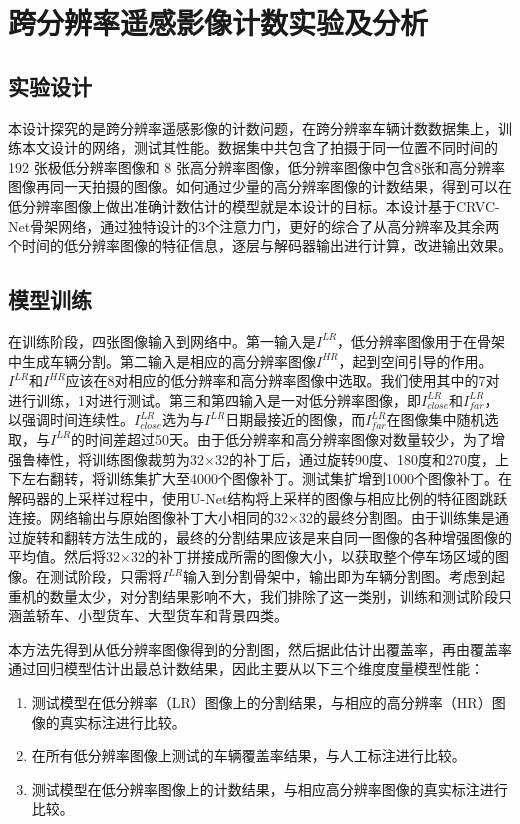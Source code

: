 \chapter{跨分辨率遥感影像计数实验及分析}
\section{实验设计}
本设计探究的是跨分辨率遥感影像的计数问题，在跨分辨率车辆计数数据集上，训练本文设计的网络，测试其性能。数据集中共包含了拍摄于同一位置不同时间的192 张极低分辨率图像和 8 张高分辨率图像，低分辨率图像中包含8张和高分辨率图像再同一天拍摄的图像。如何通过少量的高分辨率图像的计数结果，得到可以在低分辨率图像上做出准确计数估计的模型就是本设计的目标。本设计基于CRVC-Net骨架网络，通过独特设计的3个注意力门，更好的综合了从高分辨率及其余两个时间的低分辨率图像的特征信息，逐层与解码器输出进行计算，改进输出效果。

\section{模型训练}
在训练阶段，四张图像输入到网络中。第一输入是\( I^{LR}\)，低分辨率图像用于在骨架中生成车辆分割。第二输入是相应的高分辨率图像\( I^{HR}\)，起到空间引导的作用。\( I^{LR}\)和\( I^{HR}\)应该在8对相应的低分辨率和高分辨率图像中选取。我们使用其中的7对进行训练，1对进行测试。第三和第四输入是一对低分辨率图像，即\( I^{LR}_{close}\)和\( I^{LR}_{far}\)，以强调时间连续性。\( I^{LR}_{close}\)选为与\( I^{LR}\)日期最接近的图像，而\( I^{LR}_{far}\)在图像集中随机选取，与\( I^{LR}\)的时间差超过50天。由于低分辨率和高分辨率图像对数量较少，为了增强鲁棒性，将训练图像裁剪为32×32的补丁后，通过旋转90度、180度和270度，上下左右翻转，将训练集扩大至4000个图像补丁。测试集扩增到1000个图像补丁。在解码器的上采样过程中，使用U-Net结构将上采样的图像与相应比例的特征图跳跃连接。网络输出与原始图像补丁大小相同的32×32的最终分割图。由于训练集是通过旋转和翻转方法生成的，最终的分割结果应该是来自同一图像的各种增强图像的平均值。然后将32×32的补丁拼接成所需的图像大小，以获取整个停车场区域的图像。在测试阶段，只需将\( I^{LR}\)输入到分割骨架中，输出即为车辆分割图。考虑到起重机的数量太少，对分割结果影响不大，我们排除了这一类别，训练和测试阶段只涵盖轿车、小型货车、大型货车和背景四类。

本方法先得到从低分辨率图像得到的分割图，然后据此估计出覆盖率，再由覆盖率通过回归模型估计出最总计数结果，因此主要从以下三个维度度量模型性能：
\begin{enumerate}    
    \item 测试模型在低分辨率（LR）图像上的分割结果，与相应的高分辨率（HR）图像的真实标注进行比较。
    \item 在所有低分辨率图像上测试的车辆覆盖率结果，与人工标注进行比较。
    \item 测试模型在低分辨率图像上的计数结果，与相应高分辨率图像的真实标注进行比较。
\end{enumerate}

